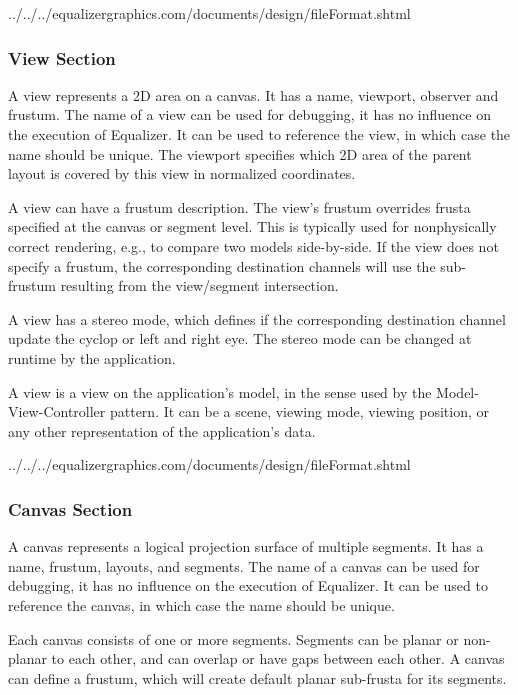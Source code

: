 \documentclass[10pt,a4]{scrartcl}
\begin{document}
{\footnotesize
  {../../../equalizergraphics.com/documents/design/fileFormat.shtml}}

\subsubsection{View Section}

A view represents a 2D area on a canvas. It has a name, viewport,
observer and frustum. The name of a view can be used for debugging, it
has no influence on the execution of Equalizer. It can be used to
reference the view, in which case the name should be unique. The viewport
specifies which 2D area of the parent layout is covered by this view in
normalized coordinates.

A view can have a frustum description. The view's frustum overrides
frusta specified at the canvas or segment level. This is typically used
for nonphysically correct rendering, e.g., to compare two models
side-by-side. If the view does not specify a frustum, the corresponding
destination channels will use the sub-frustum resulting from the
view/segment intersection.

A view has a stereo mode, which defines if the corresponding destination channel
update the cyclop or left and right eye. The stereo mode can be changed at
runtime by the application.

A view is a view on the application's model, in the sense used by the
Model-View-Controller pattern. It can be a scene, viewing mode, viewing
position, or any other representation of the application's data.

{\footnotesize
  {../../../equalizergraphics.com/documents/design/fileFormat.shtml}}

\subsubsection{Canvas Section}

A canvas represents a logical projection surface of multiple
segments. It has a name, frustum, layouts, and segments. The name of a
canvas can be used for debugging, it has no influence on the execution
of Equalizer. It can be used to reference the canvas, in which case the
name should be unique.

Each canvas consists of one or more segments. Segments can be planar or
non-planar to each other, and can overlap or have gaps between each
other. A canvas can define a frustum, which will create default planar
sub-frusta for its segments.
\end{document}
